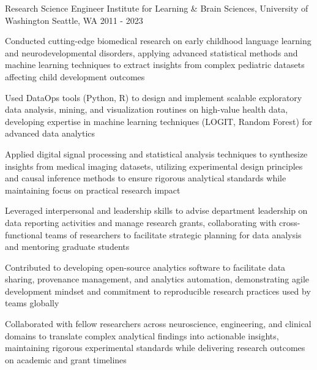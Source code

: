 \begin{cventries}
{    \vspace{2mm}
  }
  \cventry
  {Research Science Engineer} %
  {Institute for Learning \& Brain Sciences, University of Washington} %
  {Seattle, WA} %
  {2011 - 2023} %
  {
    \begin{cvitems} %
      \vspace{2mm}
      \item Conducted cutting-edge biomedical research on early childhood language learning and neurodevelopmental disorders, applying advanced statistical methods and machine learning techniques to extract insights from complex pediatric datasets affecting child development outcomes
      \item Used DataOps tools (Python, R) to design and implement scalable exploratory data analysis, mining, and visualization routines on high-value health data, developing expertise in machine learning techniques (LOGIT, Random Forest) for advanced data analytics
      \item Applied digital signal processing and statistical analysis techniques to synthesize insights from medical imaging datasets, utilizing experimental design principles and causal inference methods to ensure rigorous analytical standards while maintaining focus on practical research impact
      \item Leveraged interpersonal and leadership skills to advise department leadership on data reporting activities and manage research grants, collaborating with cross-functional teams of researchers to facilitate strategic planning for data analysis and mentoring graduate students
      \item Contributed to developing open-source analytics software to facilitate data sharing, provenance management, and analytics automation, demonstrating agile development mindset and commitment to reproducible research practices used by teams globally
      \item Collaborated with fellow researchers across neuroscience, engineering, and clinical domains to translate complex analytical findings into actionable insights, maintaining rigorous experimental standards while delivering research outcomes on academic and grant timelines
    \end{cvitems}
    \vspace{2mm}
  }


\end{cventries}
